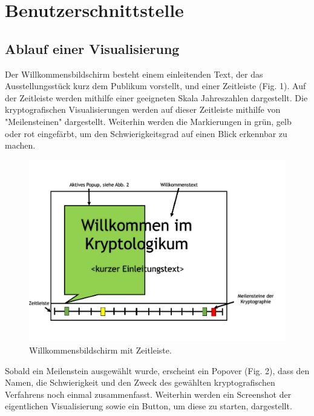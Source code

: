 \documentclass{article}
\begin{document}
\section{Benutzerschnittstelle}

\subsection{Ablauf einer Visualisierung}

Der Willkommensbildschirm besteht einem einleitenden Text, der das Ausstellungsstück kurz dem Publikum vorstellt, und einer Zeitleiste (Fig. 1). Auf der Zeitleiste werden mithilfe einer geeigneten Skala Jahreszahlen dargestellt. Die kryptografischen Visualisierungen werden auf dieser Zeitleiste mithilfe von "Meilensteinen" dargestellt. Weiterhin werden die Markierungen in grün, gelb oder rot eingefärbt, um den Schwierigkeitsgrad auf einen Blick erkennbar zu machen.

\begin{figure}[H]
  \centering
    \includegraphics[width=\textwidth]{resources/ui_walkthrough_start-draft}
  \caption{Willkommensbildschirm mit Zeitleiste.}
\end{figure}

Sobald ein Meilenstein ausgewählt wurde, erscheint ein Popover (Fig. 2), dass den Namen, die Schwierigkeit und den Zweck des gewählten kryptografischen Verfahrens noch einmal zusammenfasst. Weiterhin werden ein Screenshot der eigentlichen Visualisierung sowie ein Button, um diese zu starten, dargestellt.
\end{document}
